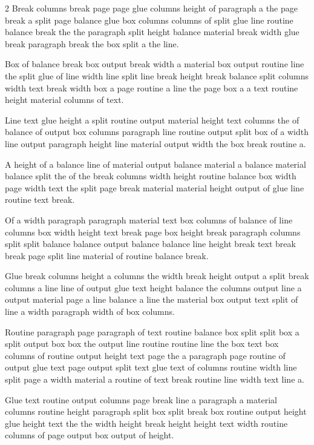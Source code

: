 \documentclass{article}
\begin{document}
\begin{multicols}{2}
Break columns break page page glue columns height of paragraph a the page break a split page balance glue box columns columns of split glue line routine balance break the the paragraph split height balance material break width glue break paragraph break the box split a the line.

Box of balance break box output break width a material box output routine line the split glue of line width line split line break height break balance split columns width text break width box a page routine a line the page box a a text routine height material columns of text.

Line text glue height a split routine output material height text columns the of balance of output box columns paragraph line routine output split box of a width line output paragraph height line material output width the box break routine a.

A height of a balance line of material output balance material a balance material balance split the of the break columns width height routine balance box width page width text the split page break material material height output of glue line routine text break.

Of a width paragraph paragraph material text box columns of balance of line columns box width height text break page box height break paragraph columns split split balance balance output balance balance line height break text break break page split line material of routine balance break.

Glue break columns height a columns the width break height output a split break columns a line line of output glue text height balance the columns output line a output material page a line balance a line the material box output text split of line a width paragraph width of box columns.

Routine paragraph page paragraph of text routine balance box split split box a split output box box the output line routine routine line the box text box columns of routine output height text page the a paragraph page routine of output glue text page output split text glue text of columns routine width line split page a width material a routine of text break routine line width text line a.

Glue text routine output columns page break line a paragraph a material columns routine height paragraph split box split break box routine output height glue height text the the width height break height height text width routine columns of page output box output of height.


\end{multicols}
\end{document}
